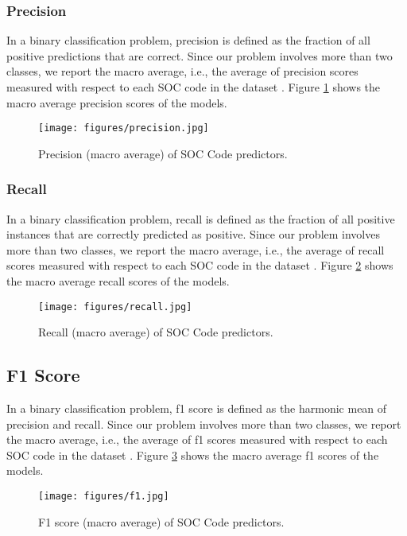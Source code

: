 \subsubsection{Precision}

In a binary classification problem, precision is defined as the fraction of all positive predictions that are correct. Since our problem involves more than two classes, we report the macro average, i.e., the average of precision scores measured with respect to each SOC code in the dataset \cite{scikit-learn-precision}. Figure \ref{fig:Precision} shows the macro average precision scores of the models.
\begin{figure}[h!]
    \centering
    \texttt{[image: figures/precision.jpg]}
    \caption{Precision (macro average) of SOC Code predictors.}
    \label{fig:Precision}
\end{figure}

\subsubsection{Recall}

In a binary classification problem, recall is defined as the fraction of all positive instances that are correctly predicted as positive. Since our problem involves more than two classes, we report the macro average, i.e., the average of recall scores measured with respect to each SOC code in the dataset \cite{scikit-learn-recall}. Figure \ref{fig:Recall} shows the macro average recall scores of the models.
\begin{figure}[h!]
    \centering
    \texttt{[image: figures/recall.jpg]}
    \caption{Recall (macro average) of SOC Code predictors.}
    \label{fig:Recall}
\end{figure}

\subsection{F1 Score}

In a binary classification problem, f1 score is defined as the harmonic mean of precision and recall. Since our problem involves more than two classes, we report the macro average, i.e., the average of f1 scores measured with respect to each SOC code in the dataset \cite{scikit-learn-f1}. Figure \ref{fig:f1} shows the macro average f1 scores of the models.
\begin{figure}[h!]
    \centering
    \texttt{[image: figures/f1.jpg]}
    \caption{F1 score (macro average) of SOC Code predictors.}
    \label{fig:f1}
\end{figure}


